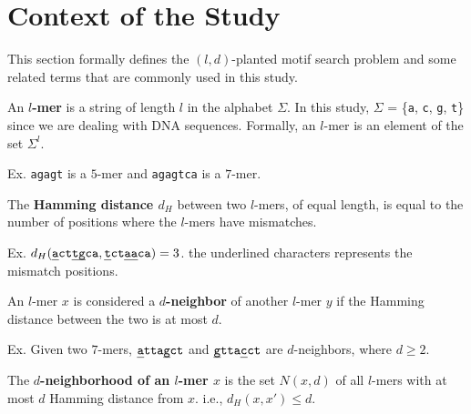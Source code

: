 \section{Context of the Study}

This section formally defines the $(l, d)$-planted motif search problem and some related terms that are commonly used in this study. \newline

 \newline
\noindent An \textbf{\boldmath $l$-mer} is a string of length $l$ in the alphabet $\Sigma$. In this study, $\Sigma$ = \{\texttt{a}, \texttt{c}, \texttt{g}, \texttt{t}\} since we are dealing with DNA sequences. Formally, an $l$-mer is an element of the set $\Sigma^l$. 

\noindent \hspace*{35pt} Ex. \texttt{agagt} is a $5$-mer and \texttt{agagtca} is a $7$-mer.  \newline

 \newline
\noindent The \textbf{\boldmath Hamming distance $d_H$} between two $l$-mers, of equal length, is equal to the number of positions where the $l$-mers have mismatches. 

\noindent \hspace*{35pt} Ex. $d_H(\texttt{\uline{a}ct\uline{tg}ca}, \texttt{\uline{t}ct\uline{aa}ca}) = 3$.\newline
\noindent \hspace*{55pt} the underlined characters represents the mismatch positions. \newline

 \newline
\noindent An $l$-mer $x$ is considered a \textbf{\boldmath $d$-neighbor} of another $l$-mer $y$ if the Hamming distance between the two is at most $d$.

\noindent \hspace*{35pt} Ex. Given two $7$-mers, $\texttt{\uline{a}tta\uline{g}ct}$ and $\texttt{\uline{g}tta\uline{c}ct}$ are $d$-neighbors, \newline
\noindent \hspace*{55pt} where $d \geq 2$. \newline

 \newline
\noindent The \textbf{\boldmath $d$-neighborhood of an $l$-mer $x$} is the set {\boldmath $N(x, d)$} of all $l$-mers with at most $d$ Hamming distance from $x$. i.e., {\boldmath $d_H (x, x') \leq d$}.

